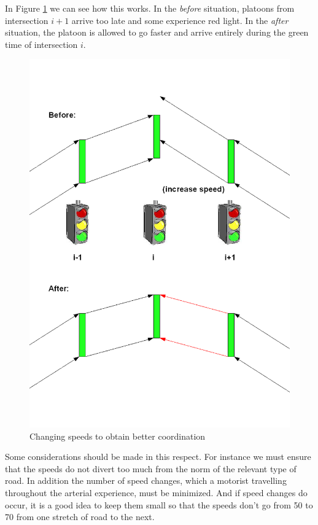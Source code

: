 In Figure \ref{fig:change_speed} we can see how this works. In the \textit{before} situation, platoons from intersection $i+1$ arrive too late and some experience red light. In the \textit{after} situation, the platoon is allowed to go faster and arrive entirely during the green time of intersection $i$.

\begin{figure}[ht]
\begin{center}
\includegraphics[scale=0.2]{change_speed.png} 
\end{center}
\caption{Changing speeds to obtain better coordination}
\label{fig:change_speed}
\end{figure}

Some considerations should be made in this respect. For instance we must ensure that the speeds do not divert too much from the norm of the relevant type of road. In addition the number of speed changes, which a motorist travelling throughout the arterial experience, must be minimized. And if speed changes do occur, it is a good idea to keep them small so that the speeds don't go from 50 to 70 from one stretch of road to the next.

